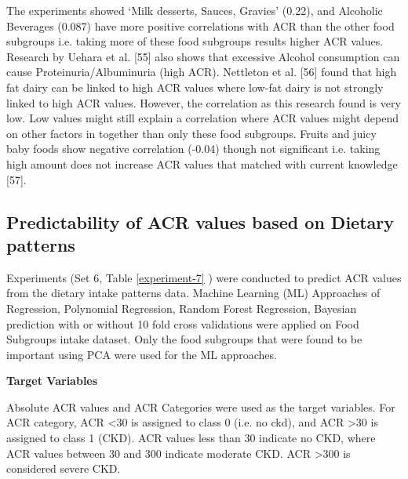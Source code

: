 \noindent The experiments showed  `Milk desserts, Sauces, Gravies' (0.22), and Alcoholic Beverages (0.087) have more positive correlations with ACR than the other food subgroups  i.e. taking more of these food subgroups results higher ACR values. Research by Uehara et al. [55] also shows that excessive Alcohol consumption can cause Proteinuria/Albuminuria (high ACR). Nettleton et al. [56] found that high fat dairy can be linked to high ACR values where low-fat dairy is not strongly linked to high ACR values. However, the correlation as this research found is very low. Low values might still explain a correlation where ACR values might depend on other factors in together than only these food subgroups. Fruits and juicy baby foods show negative correlation (-0.04) though not significant i.e. taking high amount does not increase ACR values that matched with current knowledge [57].

\subsection{Predictability of ACR values based on Dietary patterns}
Experiments (Set 6, Table \ref{experiment-7} ) were conducted to predict ACR values from the dietary intake patterns data. Machine Learning (ML) Approaches of Regression, Polynomial Regression, Random Forest Regression, Bayesian prediction with or without 10 fold cross validations were applied on Food Subgroups intake dataset. Only the food subgroups that were found to be important using PCA were used for the ML approaches.

\noindent \textbf{Target Variables}

\noindent Absolute ACR values and ACR Categories were used as the target variables.  For ACR category, ACR  \textless   30 is assigned to class 0 (i.e. no ckd), and ACR  \textgreater  30 is assigned to class 1 (CKD). ACR values less than 30 indicate no CKD, where ACR values between 30 and 300 indicate moderate CKD. ACR \textgreater 300 is considered severe CKD.

